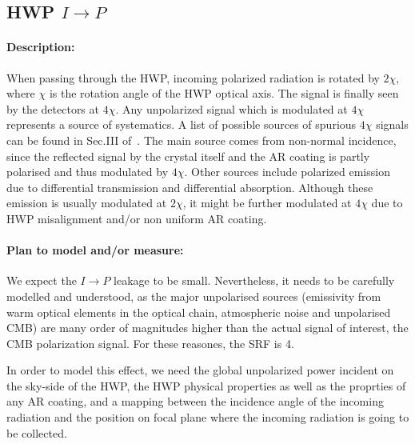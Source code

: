 \subsection{HWP $I\rightarrow P$}
\label{IP downstream of HWP}
\paragraph{Description:}
When passing through the HWP, incoming polarized radiation is rotated by $2\chi$, where $\chi$ is the rotation angle of the HWP optical axis. The signal is finally seen by the detectors at $4\chi$. Any unpolarized signal which is modulated at $4\chi$ represents a source of systematics. A list of possible sources of spurious $4\chi$ signals can be found in Sec.III of~\cite{ABS}. The main source comes from non-normal incidence, since the reflected signal by the crystal itself and the AR coating is partly polarised and thus modulated by $4\chi$. Other sources include polarized emission due to differential transmission and differential absorption. Although these emission is usually modulated at $2\chi$, it might be further modulated at $4\chi$ due to HWP misalignment and/or non uniform AR coating.

\paragraph{Plan to model and/or measure:}
We expect the $I\rightarrow P$ leakage to be small. Nevertheless, it needs to be carefully modelled and understood, as the major unpolarised sources (emissivity from warm optical elements in the optical chain, atmospheric noise and unpolarised CMB) are many order of magnitudes higher than the actual signal of interest, the CMB polarization signal. For these reasones, the SRF is 4.

In order to model this effect, we need the global unpolarized power incident on the sky-side of the HWP, the HWP physical properties as well as the proprties of any AR coating, and a mapping between the incidence angle of the incoming radiation and the position on focal plane where the incoming radiation is going to be collected. 

